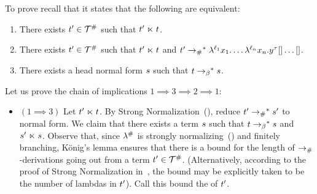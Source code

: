 To prove  recall that it states that the following are equivalent:
\begin{enumerate}
\item There exists $t' \in \mathcal{T}^{\mathtt{\#}}$ such that $t' \mathrel{\ltimes} t$.
\item There exists $t' \in \mathcal{T}^{\mathtt{\#}}$ such that $t' \mathrel{\ltimes} t$
      and $t' \mathrel{\to_{\mathtt{\#}}}^* \lambda^{\ell_1} x_1. \hdots\lambda^{\ell_n} x_n. y^\tau[]\hdots[]$.
\item There exists a head normal form $s$ such that $t \mathrel{\to_\beta}^* s$.
\end{enumerate}
Let us prove the chain of implications $1 \implies 3 \implies 2 \implies 1$:
\begin{itemize}
\item $(1 \implies 3)$
  Let $t' \mathrel{\ltimes} t$.
  By Strong Normalization~(), reduce $t' \mathrel{\to_{\mathtt{\#}}}^* s'$
  to normal form.
  We claim that there exists a term $s$ such that $t \mathrel{\to_\beta}^* s$ and $s' \mathrel{\ltimes} s$.
  Observe that, since $\lambda^{\mathtt{\#}}$ is strongly normalizing~()
  and finitely branching, K\"onig's lemma ensures that there is a bound for the length of $\mathrel{\to_{\mathtt{\#}}}$-derivations
  going out from a term $t' \in \mathcal{T}^{\mathtt{\#}}$.
  (Alternatively, according to the proof of Strong Normalization in~,
  the bound may be explicitly taken to be the number of lambdas in $t'$).
  Call this bound the  of $t'$.


\end{itemize}
